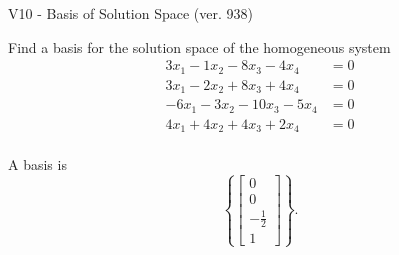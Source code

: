 \begin{exercise}
  \begin{exerciseTitle}V10 - Basis of Solution Space (ver. 938)\end{exerciseTitle}
  \begin{exerciseStatement}
    Find a basis for the solution space of the homogeneous system 
\begin{align*}
 3 x_ 1 -1 x_ 2 -8 x_ 3 -4 x_ 4 &= 0  \\ 
  3 x_ 1 -2 x_ 2 + 8 x_ 3 + 4 x_ 4 &= 0  \\ 
  -6 x_ 1 -3 x_ 2 -10 x_ 3 -5 x_ 4 &= 0  \\ 
  4 x_ 1 + 4 x_ 2 + 4 x_ 3 + 2 x_ 4 &= 0  \\ 
 \end{align*}


 
  \end{exerciseStatement}

  \begin{exerciseAnswer}
   A basis is   
\[\left\{\left[\begin{array}{c}
0 \\
0 \\
-\frac{1}{2} \\
1
\end{array}\right]\right\}.\]

  


  \end{exerciseAnswer}
\end{exercise}
